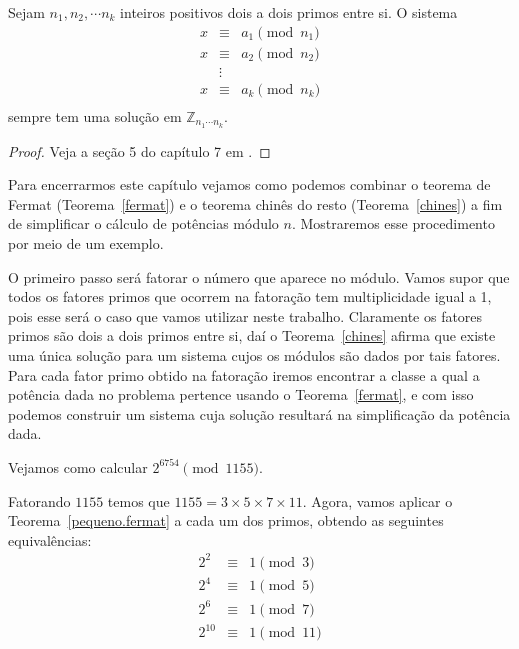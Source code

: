 \begin{Th}\label{chines}
Sejam $n_1, n_2, \cdots n_k$ inteiros positivos dois a dois primos entre si. O sistema
\[
\begin{array}{ccc}
 x & \equiv & a_1 \pmod n_1\\ 
 x & \equiv & a_2 \pmod n_2 \\
   & \vdots &   \\
x & \equiv & a_k \pmod n_k \\	
\end{array}
\]
sempre tem uma solu\c{c}\~ao em $\mathbb{Z}_{n_1\cdots n_k}$.
\end{Th}
\begin{proof}
  Veja a se\c{c}\~{a}o 5 do cap\'{i}tulo 7 em \cite{cou:2014}.  
\end{proof}

Para encerrarmos este cap\'itulo vejamos como podemos combinar o teorema de Fermat (Teorema~\ref{fermat}) 
e o teorema chin\^es do resto (Teorema~\ref{chines}) a fim de simplificar o c\'{a}lculo de pot\^{e}ncias 
m\'{o}dulo $n$. Mostraremos esse procedimento por meio de um exemplo.


O primeiro passo ser\'{a} fatorar o n\'{u}mero que aparece no m\'{o}dulo. Vamos supor que 
todos os fatores primos que ocorrem na fatora\c{c}\~{a}o tem multiplicidade igual a 1, pois esse ser\'{a} o 
caso que vamos utilizar neste trabalho. Claramente os fatores primos s\~{a}o dois a dois primos entre si,
da\'{i} o Teorema~\ref{chines} afirma que existe uma \'{u}nica solu\c{c}\~{a}o para um sistema 
cujos os m\'{o}dulos s\~{a}o dados por tais fatores. Para cada fator primo obtido na fatora\c{c}\~{a}o iremos encontrar a 
classe a qual a pot\^{e}ncia dada no problema pertence usando o Teorema~\ref{fermat}, e com isso podemos construir um 
sistema cuja solu\c{c}\~{a}o resultar\'{a} na simplifica\c{c}\~{a}o da pot\^{e}ncia dada. 

Vejamos como calcular $2^{6754} \pmod{1155}$. 					

Fatorando $1155$ temos que $1155= 3 \times 5 \times 7 \times 11$. Agora, vamos aplicar o Teorema~\ref{pequeno.fermat} 
a cada um dos primos, obtendo as seguintes equival\^{e}ncias:
\[
\begin{array}{ccl}
 2^2    & \equiv & 1 \pmod{3}\\
 2^4    & \equiv & 1 \pmod{5}\\ 
 2^6    & \equiv & 1 \pmod{7}\\  
 2^{10} & \equiv & 1 \pmod{11}\\
\end{array}
\]

